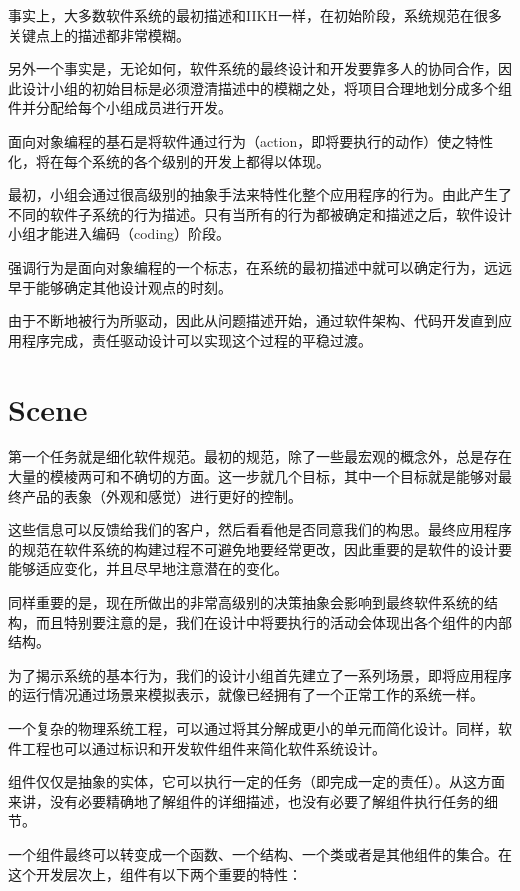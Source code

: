 事实上，大多数软件系统的最初描述和IIKH一样，在初始阶段，系统规范在很多关键点上的描述都非常模糊。

另外一个事实是，无论如何，软件系统的最终设计和开发要靠多人的协同合作，因此设计小组的初始目标是必须澄清描述中的模糊之处，将项目合理地划分成多个组件并分配给每个小组成员进行开发。

面向对象编程的基石是将软件通过行为（action，即将要执行的动作）使之特性化，将在每个系统的各个级别的开发上都得以体现。

最初，小组会通过很高级别的抽象手法来特性化整个应用程序的行为。由此产生了不同的软件子系统的行为描述。只有当所有的行为都被确定和描述之后，软件设计小组才能进入编码（coding）阶段。

强调行为是面向对象编程的一个标志，在系统的最初描述中就可以确定行为，远远早于能够确定其他设计观点的时刻。

由于不断地被行为所驱动，因此从问题描述开始，通过软件架构、代码开发直到应用程序完成，责任驱动设计可以实现这个过程的平稳过渡。

\section{Scene}


第一个任务就是细化软件规范。最初的规范，除了一些最宏观的概念外，总是存在大量的模棱两可和不确切的方面。这一步就几个目标，其中一个目标就是能够对最终产品的表象（外观和感觉）进行更好的控制。

这些信息可以反馈给我们的客户，然后看看他是否同意我们的构思。最终应用程序的规范在软件系统的构建过程不可避免地要经常更改，因此重要的是软件的设计要能够适应变化，并且尽早地注意潜在的变化。

同样重要的是，现在所做出的非常高级别的决策抽象会影响到最终软件系统的结构，而且特别要注意的是，我们在设计中将要执行的活动会体现出各个组件的内部结构。

为了揭示系统的基本行为，我们的设计小组首先建立了一系列场景，即将应用程序的运行情况通过场景来模拟表示，就像已经拥有了一个正常工作的系统一样。



一个复杂的物理系统工程，可以通过将其分解成更小的单元而简化设计。同样，软件工程也可以通过标识和开发软件组件来简化软件系统设计。

组件仅仅是抽象的实体，它可以执行一定的任务（即完成一定的责任）。从这方面来讲，没有必要精确地了解组件的详细描述，也没有必要了解组件执行任务的细节。

一个组件最终可以转变成一个函数、一个结构、一个类或者是其他组件的集合。在这个开发层次上，组件有以下两个重要的特性：

